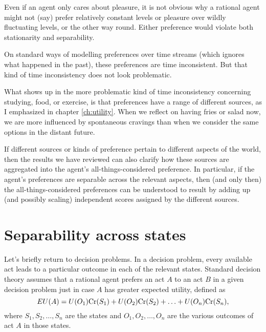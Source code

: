 Even if an agent only cares about pleasure, it is not obvious why a
rational agent might not (say) prefer relatively constant levels or
pleasure over wildly fluctuating levels, or the other way round.
Either preference would violate both stationarity and separability.


On standard ways of modelling preferences over time streams (which
ignores what happened in the past), these preferences are time
inconsistent. But that kind of time inconsistency does not look
problematic.

What shows up in the more problematic kind of time inconsistency
concerning studying, food, or exercise, is that preferences have a
range of different sources, as I emphasized in chapter
\ref{ch:utility}. When we reflect on having fries or salad now, we are
more influenced by spontaneous cravings than when we consider the same
options in the distant future.

If different sources or kinds of preference pertain to different
aspects of the world, then the results we have reviewed can also clarify
how these sources are aggregated into the agent's
all-things-considered preference. In particular, if the agent's
preferences are separable across the relevant aspects, then (and only
then) the all-things-considered preferences can be understood to
result by adding up (and possibly scaling) independent scores assigned
by the different sources.

%

\section{Separability across states}

Let's briefly return to decision problems. In a decision problem,
every available act leads to a particular outcome in each of the
relevant states. Standard decision theory assumes that a rational
agent prefers an act $A$ to an act $B$ in a given decision problem
just in case $A$ has greater expected utility, defined as
\[
EU(A) = U(O_1)\text{Cr}(S_1) + U(O_2)\text{Cr}(S_2) + \ldots + U(O_n)\text{Cr}(S_n),
\]
where $S_1,S_2,\ldots,S_n$ are the states and $O_1,O_2,\ldots,O_n$ are
the various outcomes of act $A$ in those states.

